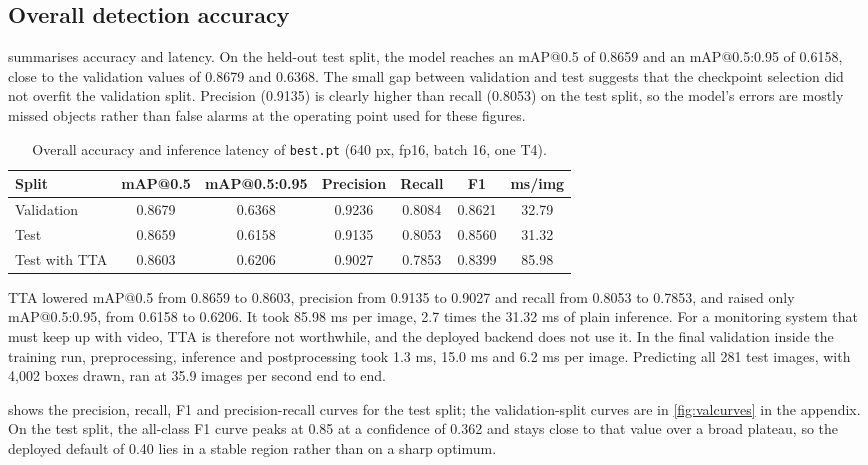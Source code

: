 \documentclass[preprint,12pt]{elsarticle}
\begin{document}
\subsection{Overall detection accuracy}

 summarises accuracy and latency. On the held-out test split, the model reaches an mAP@0.5 of 0.8659 and an mAP@0.5:0.95 of 0.6158, close to the validation values of 0.8679 and 0.6368. The small gap between validation and test suggests that the checkpoint selection did not overfit the validation split. Precision (0.9135) is clearly higher than recall (0.8053) on the test split, so the model's errors are mostly missed objects rather than false alarms at the operating point used for these figures.

\begin{table}[htbp]
\centering
\small
\caption{Overall accuracy and inference latency of \texttt{best.pt} (640 px, fp16, batch 16, one T4).}
\label{tab:overall}
\setlength{\tabcolsep}{4pt}
\begin{tabular}{@{}lcccccc@{}}
\toprule
Split & mAP@0.5 & mAP@0.5:0.95 & Precision & Recall & F1 & ms/img \\
\midrule
Validation & 0.8679 & 0.6368 & 0.9236 & 0.8084 & 0.8621 & 32.79 \\
Test & 0.8659 & 0.6158 & 0.9135 & 0.8053 & 0.8560 & 31.32 \\
Test with TTA & 0.8603 & 0.6206 & 0.9027 & 0.7853 & 0.8399 & 85.98 \\
\bottomrule
\end{tabular}
\end{table}

TTA lowered mAP@0.5 from 0.8659 to 0.8603, precision from 0.9135 to 0.9027 and recall from 0.8053 to 0.7853, and raised only mAP@0.5:0.95, from 0.6158 to 0.6206. It took 85.98 ms per image, 2.7 times the 31.32 ms of plain inference. For a monitoring system that must keep up with video, TTA is therefore not worthwhile, and the deployed backend does not use it. In the final validation inside the training run, preprocessing, inference and postprocessing took 1.3 ms, 15.0 ms and 6.2 ms per image. Predicting all 281 test images, with 4,002 boxes drawn, ran at 35.9 images per second end to end.

 shows the precision, recall, F1 and precision-recall curves for the test split; the validation-split curves are in \cref{fig:valcurves} in the appendix. On the test split, the all-class F1 curve peaks at 0.85 at a confidence of 0.362 and stays close to that value over a broad plateau, so the deployed default of 0.40 lies in a stable region rather than on a sharp optimum.
\end{document}
